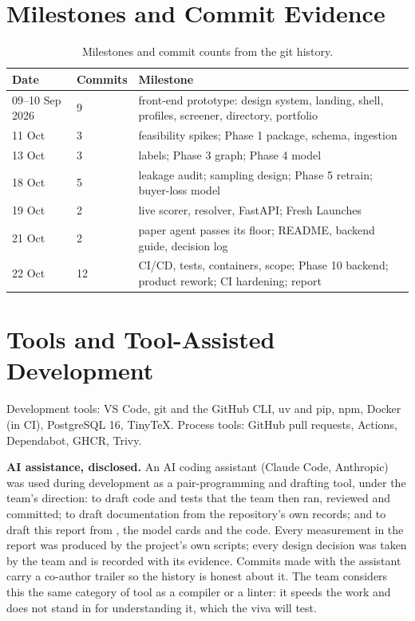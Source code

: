 \section{Milestones and Commit Evidence}
\begin{table}[H]
\centering\small
\begin{tabular}{llp{}}
\toprule
Date & Commits & Milestone\\
\midrule
09--10 Sep 2026 & 9 & front-end prototype: design system, landing, shell, profiles, screener, directory, portfolio\\
11 Oct & 3 & feasibility spikes; Phase 1 package, schema, ingestion\\
13 Oct & 3 & labels; Phase 3 graph; Phase 4 model\\
18 Oct & 5 & leakage audit; sampling design; Phase 5 retrain; buyer-loss model\\
19 Oct & 2 & live scorer, resolver, FastAPI; Fresh Launches\\
21 Oct & 2 & paper agent passes its floor; README, backend guide, decision log\\
22 Oct & 12 & CI/CD, tests, containers, scope; Phase 10 backend; product rework; CI hardening; report\\
\bottomrule
\end{tabular}
\caption{Milestones and commit counts from the git history.}
\end{table}

\section{Tools and Tool-Assisted Development}
\label{sec:tools}
Development tools: VS Code, git and the GitHub CLI, uv and pip, npm, Docker (in CI), PostgreSQL 16, TinyTeX. Process tools: GitHub pull requests, Actions, Dependabot, GHCR, Trivy.

\textbf{AI assistance, disclosed.} An AI coding assistant (Claude Code, Anthropic) was used during development as a pair-programming and drafting tool, under the team's direction: to draft code and tests that the team then ran, reviewed and committed; to draft documentation from the repository's own records; and to draft this report from , the model cards and the code. Every measurement in the report was produced by the project's own scripts; every design decision was taken by the team and is recorded with its evidence. Commits made with the assistant carry a co-author trailer so the history is honest about it. The team considers this the same category of tool as a compiler or a linter: it speeds the work and does not stand in for understanding it, which the viva will test.

